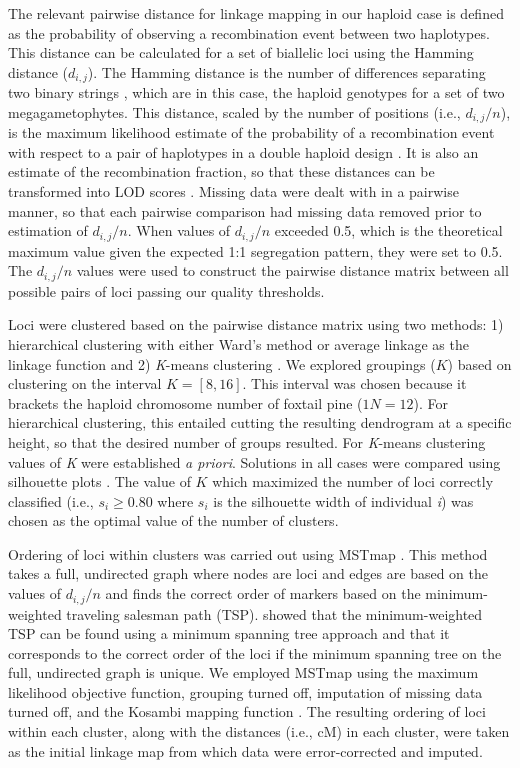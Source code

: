\documentclass[11pt]{article}
\begin{document}
The relevant pairwise distance for linkage mapping in our haploid case is defined as the probability 
of observing a recombination event between two haplotypes. This distance can be calculated for a set of 
biallelic loci using the Hamming distance ($d_{i,j}$).
The Hamming distance is the number of differences separating two binary strings \citep{Hamming:1950}, which are 
in this case, the haploid genotypes for a set of two megagametophytes. 
This distance, scaled by the number of positions (i.e., $d_{i,j}/n$), 
is the maximum likelihood estimate of the probability of a recombination event with respect to a pair of haplotypes 
in a double haploid design \citep{Wu:2008a}. It is also an estimate of the recombination fraction, so that these distances can be transformed into LOD 
scores \citep[see][]{Morton:1955}. Missing data were dealt with in a pairwise manner, so that each pairwise comparison had 
missing data removed prior to estimation of $d_{i,j}/n$. When values of $d_{i,j}/n$ exceeded 0.5, which is the theoretical maximum 
value given the expected 1:1 segregation pattern, they were set to 0.5.  The $d_{i,j}/n$ values were used to construct the 
pairwise distance matrix between all possible pairs of loci passing our quality thresholds.

Loci were clustered based on the pairwise distance matrix using two methods: 1) hierarchical clustering with 
either Ward's method \citep{Ward:1963} or average linkage \citep{Sokal:1958} as the linkage function and 2) \textit{K}-means 
clustering \citep{Hartigan:1979}. We explored groupings ($K$) based on clustering on the interval $K=[8,16]$. This interval was 
chosen because it brackets the haploid chromosome number of foxtail pine ($1N = 12$). For hierarchical clustering, this entailed 
cutting the resulting dendrogram at a specific height, so that the desired number of groups resulted. For \textit{K}-means clustering 
values of \textit{K} were established \textit{a priori}. Solutions in all cases were compared using silhouette plots \citep{Rousseeuw:1987}. 
The value of $K$ which maximized the number of loci correctly classified  (i.e., $s_{i} \geq 0.80$ where $s_{i}$ is the silhouette width 
of individual \textit{i}) was chosen as the optimal value of the number of clusters.

Ordering of loci within clusters was carried out using MSTmap \citep{Wu:2008a}. This method takes a full, undirected graph where 
nodes are loci and edges are based on the values of $d_{i,j}/n$ and finds the correct order of markers based on the minimum-weighted 
traveling salesman path (TSP). \citet{Wu:2008a} showed that the minimum-weighted TSP can be found using a minimum spanning tree approach 
and that it corresponds to the correct order of the loci if the minimum spanning tree on the full, undirected graph is unique. We 
employed MSTmap using the maximum likelihood objective function, grouping turned off, imputation of missing data turned off, and the 
Kosambi mapping function \citep{Kosambi:1944}. The resulting ordering of loci within each cluster, along with the distances (i.e., cM) 
in each cluster, were taken as the initial linkage map from which data were error-corrected and imputed.
 
\end{document}
